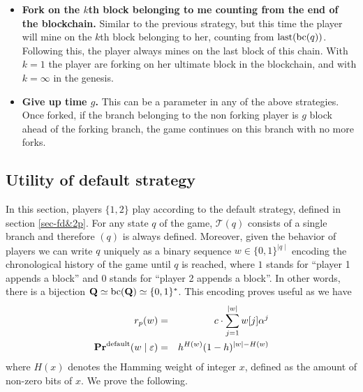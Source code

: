 \begin{itemize}
\item {\bf Fork on the $k$th block belonging to me counting from the end of the blockchain.} Similar to the previous strategy, but this time the player will mine on the $k$th block belonging to her, counting from $\text{\rm last}(\text{bc}(q))$. Following this, the player always mines on the last block of this chain. With $k=1$ the player are forking on her ultimate block in the blockchain, and with $k=\infty$ in the genesis.

\item {\bf Give up time $g$.} This can be a parameter in any of the above strategies. Once forked, if the branch belonging to the non forking player is $g$ block ahead of the forking branch, the game continues on this branch with no more forks.
\end{itemize}


\subsection{Utility of default strategy}
In this section, players $\{1,2\}$ play according to the default strategy, defined in section \ref{sec-fd&2p}. For any state $q$ of the game, $\mathcal{T}(q)$ consists of a single branch and therefore \bchain$(q)$ is always defined. Moreover, given the behavior of players we can write $q$ uniquely as a binary sequence $w\in\{0,1\}^{\mid q\mid }$ encoding the chronological history of the game until $q$ is reached, where $1$ stands for ``player 1 appends a block'' and $0$ stands for ``player 2 appends a block''. In other words, there is a bijection $ \mathbf{Q} \simeq\text{bc}(\mathbf{Q})\simeq \{0,1\}^\ast$. This encoding proves useful as we have
\begin{eqnarray*}
	r_p(w) &=&	c\cdot \sum_{j=1}^{\mid w\mid}w[j] \alpha^j  \\
	\mathbf{Pr}^{\text{\rm default}}(w \mid \varepsilon) &=&	h^{H(w)}(1-h)^{|w|-H(w)}
\end{eqnarray*}
where $H(x)$ denotes the Hamming weight of integer $x$, defined as the amount of non-zero bits of $x$. We prove the following.


